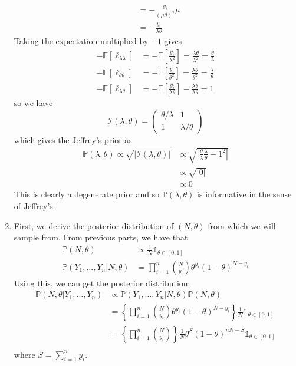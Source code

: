 \documentclass[letterpaper,10pt]{amsart}
\newcommand{\sumin}{\sum_{i=1}^n}
\newcommand{\prodin}{\prod_{i=1}^n}
\newcommand{\E}[1]{\mathbb{E}\!\left[#1\right]}
\newcommand{\p}[1]{\mathbb{P}\!\left(#1\right)}
\newcommand{\sI}{\mathcal{I}}
\begin{document}
\begin{enumerate}[{1}.1]
\begin{align*}
&= -\frac{y_i }{(\mu \theta)^2} \mu\\
&= -\frac{y_i}{\lambda \theta}
\end{align*}
Taking the expectation multiplied by $-1$ gives
\begin{align*}
-\E{\ell_{\lambda \lambda}} &= -\E{\frac{y_i}{\lambda^2}} = \frac{\lambda \theta}{\lambda^2} = \frac{\theta}{\lambda}\\
-\E{\ell_{\theta \theta}} &= -\E{\frac{y_i}{\theta^2}} = \frac{\lambda \theta}{\theta^2} = \frac{\lambda}{\theta}\\
-\E{\ell_{\lambda \theta}} &= -\E{\frac{y_i}{\lambda \theta}}-\frac{\lambda \theta}{\lambda \theta} = 1
\end{align*}
so we have
\[\sI(\lambda, \theta) = \begin{pmatrix}
\theta/\lambda & 1\\
1 & \lambda/\theta
\end{pmatrix} \]
which gives the Jeffrey's prior as
\begin{align*}
\p{\lambda, \theta} \propto \sqrt{|\sI(\lambda, \theta)|} &\propto \sqrt{\left|\frac{\theta}{\lambda}\frac{\lambda}{\theta} - 1^2 \right|}\\
 &\propto \sqrt{|0|}\\
 &\propto 0
\end{align*}
This is clearly a degenerate prior and so $\p{\lambda, \theta}$ is informative in the sense of Jeffrey's.

\item
First, we derive the posterior distribution of $(N,\theta)$ from which we will sample from. From previous parts, we have that
\begin{align*}
\p{N, \theta} &\propto \frac{1}{N} \mathds{1}_{\theta \in [0,1]}\\
\p{Y_1, \ldots, Y_n | N, \theta} &= \prod_{i=1}^n \binom{N}{y_i} \theta^{y_i} (1-\theta)^{N-y_i}
\end{align*}
Using this, we can get the posterior distribution: 
\begin{align*}
\p{N, \theta | Y_1, \ldots, Y_n} &\propto \p{Y_1, \ldots, Y_n | N, \theta} \p{N, \theta}\\
&= \left\{\prodin \binom{N}{y_i} \theta^{y_i} (1-\theta)^{N - y_i}\right\} \frac{1}{N} \mathds{1}_{\theta \in [0,1]}\\
&= \left\{\prodin \binom{N}{y_i}\right\}\frac{1}{N} \theta^S (1-\theta)^{nN-S} \mathds{1}_{\theta \in [0,1]}\\
\end{align*}
where $S = \sumin y_i$. 


\end{enumerate}
\end{document}
